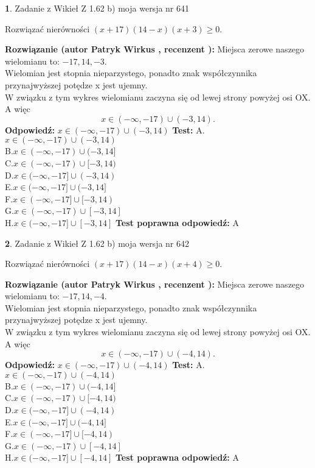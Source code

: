 \documentclass[12pt, a4paper]{article}
\theoremstyle{definition} %
\newtheorem{zad}{}
\newcommand{\zadStart}[1]{\begin{zad}#1\newline}
\newcommand{\zadStop}{\end{zad}}
\newcommand{\rozwStart}[2]{\noindent \textbf{Rozwiązanie (autor #1 , recenzent #2): }\newline}
\newcommand{\rozwStop}{\newline}
\newcommand{\odpStart}{\noindent \textbf{Odpowiedź:}\newline}
\newcommand{\odpStop}{\newline}
\newcommand{\testStart}{\noindent \textbf{Test:}\newline}
\newcommand{\testStop}{\newline}
\newcommand{\kluczStart}{\noindent \textbf{Test poprawna odpowiedź:}\newline}
\newcommand{\kluczStop}{\newline}
\begin{document}
\zadStart{Zadanie z Wikieł Z 1.62 b) moja wersja nr 641}

Rozwiązać nierówności $(x+17)(14-x)(x+3)\ge0$.
\zadStop
\rozwStart{Patryk Wirkus}{}
Miejsca zerowe naszego wielomianu to: $-17, 14, -3$.\\
Wielomian jest stopnia nieparzystego, ponadto znak współczynnika przy\linebreak najwyższej potędze x jest ujemny.\\ W związku z tym wykres wielomianu zaczyna się od lewej strony powyżej osi OX. A więc $$x \in (-\infty,-17) \cup (-3,14).$$
\rozwStop
\odpStart
$x \in (-\infty,-17) \cup (-3,14)$
\odpStop
\testStart
A.$x \in (-\infty,-17) \cup (-3,14)$\\
B.$x \in (-\infty,-17) \cup (-3,14]$\\
C.$x \in (-\infty,-17) \cup [-3,14)$\\
D.$x \in (-\infty,-17] \cup (-3,14)$\\
E.$x \in (-\infty,-17] \cup (-3,14]$\\
F.$x \in (-\infty,-17] \cup [-3,14)$\\
G.$x \in (-\infty,-17) \cup [-3,14]$\\
H.$x \in (-\infty,-17] \cup [-3,14]$
\testStop
\kluczStart
A
\kluczStop



\zadStart{Zadanie z Wikieł Z 1.62 b) moja wersja nr 642}

Rozwiązać nierówności $(x+17)(14-x)(x+4)\ge0$.
\zadStop
\rozwStart{Patryk Wirkus}{}
Miejsca zerowe naszego wielomianu to: $-17, 14, -4$.\\
Wielomian jest stopnia nieparzystego, ponadto znak współczynnika przy\linebreak najwyższej potędze x jest ujemny.\\ W związku z tym wykres wielomianu zaczyna się od lewej strony powyżej osi OX. A więc $$x \in (-\infty,-17) \cup (-4,14).$$
\rozwStop
\odpStart
$x \in (-\infty,-17) \cup (-4,14)$
\odpStop
\testStart
A.$x \in (-\infty,-17) \cup (-4,14)$\\
B.$x \in (-\infty,-17) \cup (-4,14]$\\
C.$x \in (-\infty,-17) \cup [-4,14)$\\
D.$x \in (-\infty,-17] \cup (-4,14)$\\
E.$x \in (-\infty,-17] \cup (-4,14]$\\
F.$x \in (-\infty,-17] \cup [-4,14)$\\
G.$x \in (-\infty,-17) \cup [-4,14]$\\
H.$x \in (-\infty,-17] \cup [-4,14]$
\testStop
\kluczStart
A
\kluczStop
\end{document}
